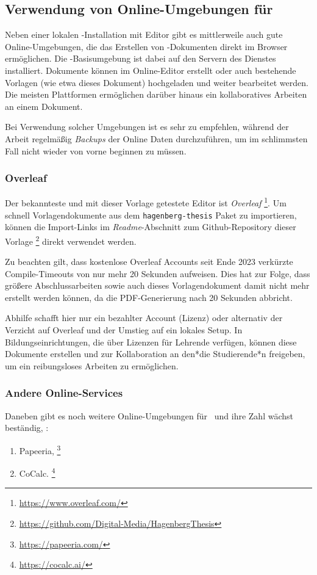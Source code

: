 \subsection{Verwendung von Online-Umgebungen für \latex}

Neben einer lokalen \latex-Installation mit Editor gibt es mittlerweile auch
gute Online-Umgebungen, die das Erstellen von \latex-Dokumenten direkt im Browser
ermöglichen. Die \latex-Basisumgebung ist dabei auf den Servern des Dienstes
installiert. Dokumente können im Online-Editor erstellt oder auch bestehende
Vorlagen (wie etwa dieses Dokument) hochgeladen und weiter bearbeitet werden.
Die meisten Plattformen ermöglichen darüber hinaus ein kollaboratives
Arbeiten an einem Dokument.

Bei Verwendung solcher Umgebungen ist es sehr zu empfehlen, während
der Arbeit regelmäßig \emph{Backups} der Online Daten durchzuführen, um 
im schlimmsten Fall nicht wieder von vorne beginnen zu müssen.

\subsubsection{Overleaf}

Der bekannteste und mit dieser Vorlage getestete Editor ist \emph{Overleaf}%
\footnote{\url{https://www.overleaf.com/}}.
Um schnell Vorlagendokumente aus dem \texttt{hagenberg-thesis} Paket zu
importieren, können die Im\-port-Links im \emph{Readme}-Abschnitt zum
Github-Repository dieser Vorlage%
\footnote{\url{https://github.com/Digital-Media/HagenbergThesis}}
direkt verwendet werden.

Zu beachten gilt, dass kostenlose Overleaf Accounts seit Ende 2023
verkürzte Com\-pile-Timeouts von nur mehr 20 Sekunden aufweisen. Dies hat zur
Folge, dass größere Abschlussarbeiten sowie auch dieses Vorlagendokument damit
nicht mehr erstellt werden können, da die PDF-Generierung nach 20 Sekunden
abbricht.

Abhilfe schafft hier nur ein bezahlter Account (Lizenz) oder alternativ der
Verzicht auf Overleaf und der Umstieg auf ein lokales Setup.
In Bildungseinrichtungen, die über Lizenzen für Lehrende verfügen, können diese
Dokumente erstellen und zur Kollaboration an den*die Studierende*n freigeben, um
ein reibungsloses Arbeiten zu ermöglichen.

\subsubsection{Andere Online-Services}

Daneben gibt es noch weitere Online-Umgebungen für \latex\ und ihre Zahl wächst
beständig, \zB:
%
\begin{enumerate}
	\item Papeeria,%
	\footnote{\url{https://papeeria.com/}}
	\item CoCalc.%
	\footnote{\url{https://cocalc.ai/}}
\end{enumerate}
